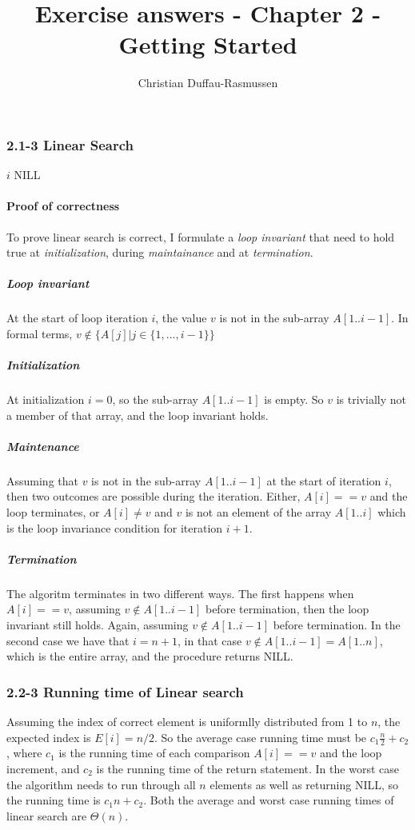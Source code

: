 \documentclass{article}
\title{Exercise answers - Chapter 2 - Getting Started}
\author{Christian Duffau-Rasmussen}
\let\oldReturn\Return
\renewcommand{\Return}{\State\oldReturn}
\begin{document}
\maketitle

\subsubsection*{2.1-3 Linear Search}

\begin{algorithmic}[1]
		\Return $i$
	\EndIf
\EndFor
\Return NILL
\EndProcedure
\end{algorithmic}

\paragraph{Proof of correctness}

To prove linear search is correct, I formulate a \emph{loop invariant} that need to hold true at \emph{initialization}, during \emph{maintainance} and at \emph{termination}.

\subparagraph{Loop invariant} At the start of loop iteration $i$, the value $v$ is not in the sub-array $A[1..i-1]$. In formal terms, $v \notin \{ A[j] \vert j\in\{1,...,i-1\} \}$

\subparagraph{Initialization} At initialization $i=0$, so the sub-array $A[1..i-1]$ is empty. So $v$ is trivially not a member of that array, and the loop invariant holds.

\subparagraph{Maintenance} Assuming that $v$ is not in the sub-array $A[1..i-1]$ at the start of iteration $i$, then two outcomes are possible during the iteration. Either, $A[i] == v$ and the loop terminates, or $A[i]\neq v$ and $v$ is not an element of the array $A[1..i]$ which is the loop invariance condition for iteration $i+1$.

\subparagraph{Termination} The algoritm terminates in two different ways. The first happens when $A[i] == v$, assuming $v \notin A[1..i-1]$ before termination, then the loop invariant still holds. Again, assuming $v \notin A[1..i-1]$ before termination. In the second case we have that $i=n+1$, in that case $v \notin A[1..i-1]=A[1..n]$, which is the entire array, and the procedure returns NILL.

\subsubsection*{2.2-3 Running time of Linear search}
Assuming the index of correct element is uniformlly distributed from 1 to $n$, the expected index is $E[i] = n/2$. So the average case running time must be $c_1\frac{n}{2} + c_2$, where $c_1$ is the running time of each comparison $A[i]==v$ and the loop increment,  and $c_2$ is the running time of the return statement. In the worst case the algorithm needs to run through all $n$ elements as well as returning NILL, so the running time is $c_1n + c_2$.  
Both the average and worst case running times of linear search are $\Theta(n)$.
\end{document}
